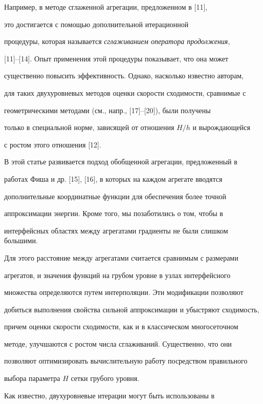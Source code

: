 Например, в методе {сглаженной агрегации}, предложенном в [11],


это достигается с помощью дополнительной итерационной


процедуры, которая называется {\em сглаживанием оператора продолжения},


[11]--[14]. Опыт применения этой процедуры показывает, что она может


существенно повысить эффективность. Однако, насколько известно авторам,


для таких двухуровневых методов оценки скорости сходимости, сравнимые с


геометрическими методами (см., напр., [17]--[20]), были получены


только в специальной норме, зависящей от отношения $H/h$ и вырождающейся


с ростом этого отношения [12].





В этой статье развивается подход {обобщенной агрегации}, предложенный в


работах Фиша и др. [15], [16], в которых на каждом агрегате вводятся


дополнительные координатные функции для обеспечения более точной


аппроксимации энергии. Кроме того, мы позаботились о том, чтобы в


интерфейсных областях между агрегатами градиенты не были слишком большими.


Для этого расстояние между агрегатами считается сравнимым с размерами


агрегатов, и значения функций на грубом уровне в узлах интерфейсного


множества определяются путем интерполяции. Эти модификации позволяют


добиться выполнения свойства сильной аппроксимации и убыстряют сходимость,


причем оценки скорости сходимости, как и в классическом многосеточном


методе, улучшаются с ростом числа сглаживаний. Существенно, что они


позволяют оптимизировать вычислительную работу посредством правильного


выбора параметра $H$ сетки грубого уровня.





Как известно, двухуровневые итерации могут быть использованы в


